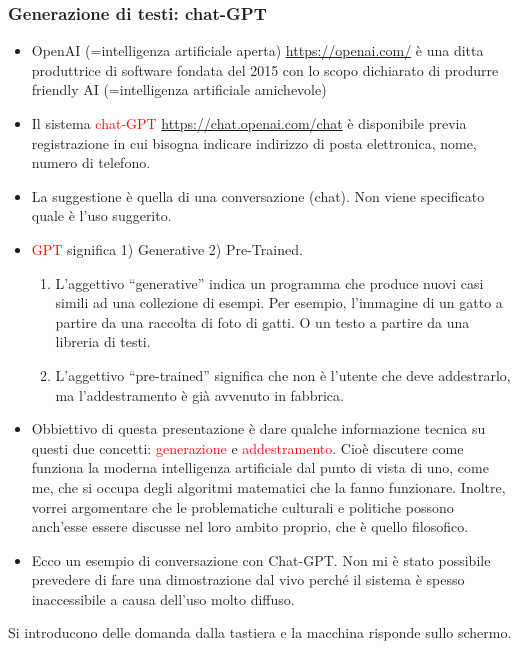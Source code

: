 \documentclass[xcolor=svgnames]{beamer}
\newcommand{\rosso}[1]{\textcolor{red}{#1}}
\renewcommand{\emph}{\rosso}
\begin{document}
\begin{frame}\small\frametitle{Generazione di testi: chat-GPT}

\begin{itemize}
\item OpenAI (=intelligenza artificiale aperta)  \url{https://openai.com/} è una ditta produttrice di software fondata del 2015 con lo scopo dichiarato di produrre friendly 
AI (=intelligenza artificiale amichevole)
    \item Il sistema \emph{chat-GPT} \url{https://chat.openai.com/chat} è disponibile previa registrazione in cui bisogna indicare indirizzo di posta elettronica, nome, numero di telefono.
    \item La suggestione è quella di una conversazione (chat). Non viene specificato quale è l'uso suggerito.
    \item \emph{GPT} significa 1) Generative 2) Pre-Trained. 
    \begin{enumerate}
        \item L'aggettivo ``generative'' indica un programma che produce nuovi casi simili ad una collezione di esempi. Per esempio, l'immagine di un gatto a partire da una raccolta di foto di gatti. O un testo a partire da una libreria di testi.
        \item L'aggettivo ``pre-trained'' significa che non è l'utente che deve addestrarlo, ma l'addestramento è già avvenuto in fabbrica.
    \end{enumerate} 
    \item Obbiettivo di questa presentazione è dare qualche informazione tecnica su questi due concetti: \emph{generazione} e \emph{addestramento}. Cioè discutere come funziona la moderna intelligenza artificiale dal punto di vista di uno, come me,  che si occupa degli algoritmi matematici che la fanno funzionare. Inoltre, vorrei argomentare che le problematiche culturali e politiche possono anch'esse essere discusse nel loro ambito proprio, che è quello filosofico.
    \item     Ecco un esempio di conversazione con Chat-GPT. Non mi è stato possibile prevedere di fare una dimostrazione dal vivo perché il sistema è spesso inaccessibile a causa dell'uso molto diffuso.
    \end{itemize}

    \newpage

    Si introducono delle domanda dalla tastiera e la macchina risponde sullo schermo.

    \vfill
    

\end{frame}
\end{document}
